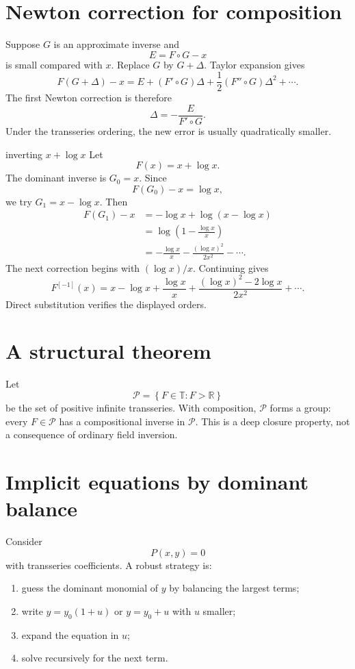 \documentclass[11pt,openany]{book}
\theoremstyle{plain}
\theoremstyle{definition}
\theoremstyle{remark}
\newcommand{\R}{\mathbb{R}}
\newcommand{\Tfield}{\mathbb{T}}
\newcommand{\set}[1]{\left\{#1\right\}}
\begin{document}
\section{Newton correction for composition}
Suppose $G$ is an approximate inverse and
\[
  E=F\circ G-x
\]
is small compared with $x$. Replace $G$ by $G+\Delta$. Taylor expansion gives
\[
  F(G+\Delta)-x
  =E+(F'\circ G)\Delta
   +\frac12(F''\circ G)\Delta^2+\cdots.
\]
The first Newton correction is therefore
\[
  \Delta=-\frac{E}{F'\circ G}.
\]
Under the transseries ordering, the new error is usually quadratically smaller.

\begin{workedbox}{inverting $x+\log x$}
Let
\[
  F(x)=x+\log x.
\]
The dominant inverse is $G_0=x$. Since
\[
  F(G_0)-x=\log x,
\]
we try $G_1=x-\log x$. Then
\begin{align*}
 F(G_1)-x
 &= -\log x+\log(x-\log x)\\
 &=\log\left(1-\frac{\log x}{x}\right)\\
 &=-\frac{\log x}{x}
   -\frac{(\log x)^2}{2x^2}-\cdots.
\end{align*}
The next correction begins with $(\log x)/x$. Continuing gives
\[
  F^{[-1]}(x)
  =x-\log x+\frac{\log x}{x}
   +\frac{(\log x)^2-2\log x}{2x^2}
   +\cdots.
\]
Direct substitution verifies the displayed orders.
\end{workedbox}

\section{A structural theorem}
Let
\[
  \mathcal P=\set{F\in\Tfield:F>\R}
\]
be the set of positive infinite transseries. With composition, $\mathcal P$ forms a group: every $F\in\mathcal P$ has a compositional inverse in $\mathcal P$. This is a deep closure property, not a consequence of ordinary field inversion.

\section{Implicit equations by dominant balance}
Consider
\[
  P(x,y)=0
\]
with transseries coefficients. A robust strategy is:
\begin{enumerate}
\item guess the dominant monomial of $y$ by balancing the largest terms;
\item write $y=y_0(1+u)$ or $y=y_0+u$ with $u$ smaller;
\item expand the equation in $u$;
\item solve recursively for the next term.
\end{enumerate}
\end{document}
